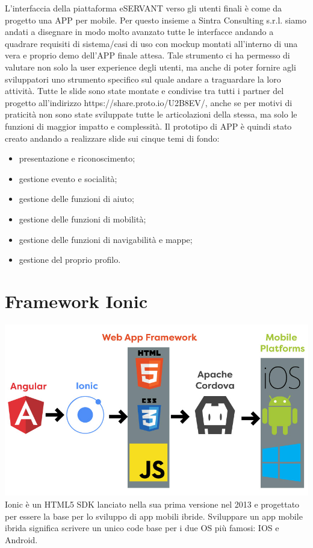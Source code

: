 L’interfaccia della piattaforma eSERVANT verso gli utenti finali è come da progetto una APP per mobile.
Per questo insieme a Sintra Consulting s.r.l. siamo andati a disegnare in modo molto avanzato tutte le interfacce andando a quadrare requisiti di sistema/casi di uso con mockup montati all’interno di una vera e proprio demo dell’APP finale attesa.
Tale strumento ci ha permesso di valutare non solo la user experience degli utenti, ma anche di poter fornire agli sviluppatori uno strumento specifico sul quale andare a traguardare la loro attività.
Tutte le slide sono state montate e condivise tra tutti i partner del progetto all’indirizzo https://share.proto.io/U2B8EV/, anche se per motivi di praticità non sono state sviluppate tutte le articolazioni della stessa, ma solo le funzioni di maggior impatto e complessità.
Il prototipo di APP è quindi stato creato andando a realizzare slide sui cinque temi di fondo:
\begin{itemize}
\item presentazione e riconoscimento;
\item gestione evento e socialità;
\item gestione delle funzioni di aiuto;
\item gestione delle funzioni di mobilità;
\item gestione delle funzioni di navigabilità e mappe;
\item gestione del proprio profilo.
\end{itemize}

\section{Framework Ionic}
\includegraphics[scale=0.50]{img/cap2/angular-ionic}\\
Ionic è un HTML5 SDK lanciato nella sua prima versione nel 2013 e progettato per essere la base per lo sviluppo di app mobili ibride. 
Sviluppare un app mobile ibrida significa scrivere un unico code base per i due OS più famosi: IOS e Android.

